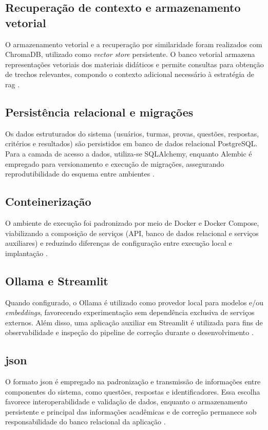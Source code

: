 \subsection{Recuperação de contexto e armazenamento vetorial}
O armazenamento vetorial e a recuperação por similaridade foram realizados com ChromaDB, utilizado como \textit{vector store} persistente. O banco vetorial armazena representações vetoriais dos materiais didáticos e permite consultas para obtenção de trechos relevantes, compondo o contexto adicional necessário à estratégia de \gls{rag} \cite{chromadb_docs_2026}.

\subsection{Persistência relacional e migrações}
Os dados estruturados do sistema (usuários, turmas, provas, questões, respostas, critérios e resultados) são persistidos em banco de dados relacional PostgreSQL. Para a camada de acesso a dados, utiliza-se SQLAlchemy, enquanto Alembic é empregado para versionamento e execução de migrações, assegurando reprodutibilidade do esquema entre ambientes \cite{postgresql_docs_2026,sqlalchemy_docs_2026,alembic_docs_2026}.

\subsection{Conteinerização}
O ambiente de execução foi padronizado por meio de Docker e Docker Compose, viabilizando a composição de serviços (API, banco de dados relacional e serviços auxiliares) e reduzindo diferenças de configuração entre execução local e implantação \cite{docker_docs_2026,docker_compose_docs_2026}.

\subsection{Ollama e Streamlit}
Quando configurado, o Ollama é utilizado como provedor local para modelos e/ou \textit{embeddings}, favorecendo experimentação sem dependência exclusiva de serviços externos. Além disso, uma aplicação auxiliar em Streamlit é utilizada para fins de observabilidade e inspeção do pipeline de correção durante o desenvolvimento \cite{ollama_docs_2026,streamlit_docs_2026}.

\subsection{\texorpdfstring{\gls{json}}{JSON}}
O formato \gls{json} é empregado na padronização e transmissão de informações entre componentes do sistema, como questões, respostas e identificadores. Essa escolha favorece interoperabilidade e validação de dados, enquanto o armazenamento persistente e principal das informações acadêmicas e de correção permanece sob responsabilidade do banco relacional da aplicação \cite{rfc8259_json_2017}.

